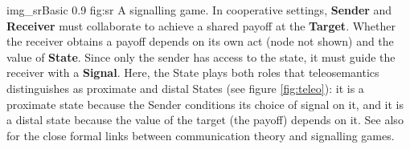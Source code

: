 \begin{myfig}
    {img_srBasic} %
    {0.9} %
    {fig:sr} %
    {A signalling game.
    In cooperative settings, \textbf{Sender} and \textbf{Receiver} must collaborate to achieve a shared payoff at the \textbf{Target}.
    Whether the receiver obtains a payoff depends on its own act (node not shown) and the value of \textbf{State}.
    Since only the sender has access to the state, it must guide the receiver with a \textbf{Signal}.
    Here, the State plays both roles that teleosemantics distinguishes as proximate and distal States (see figure \ref{fig:teleo}): it is a proximate state because the Sender conditions its choice of signal on it, and it is a distal state because the value of the target (the payoff) depends on it.
    See also \citet{martinez2019deception} for the close formal links between communication theory and signalling games.
    } %
\end{myfig}